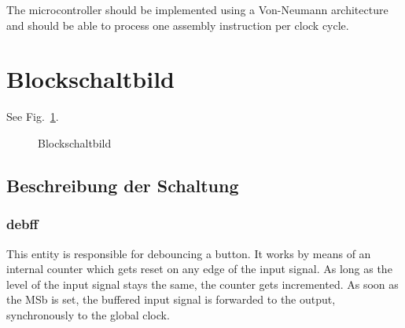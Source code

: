 \documentclass[a4paper,10pt]{scrartcl}
\begin{document}
The microcontroller should be implemented using a Von-Neumann architecture and should be able to process one assembly instruction per clock cycle. 


\section{Blockschaltbild}
\label{sec:block}

See Fig.\ \ref{fig:block}.


\begin{figure}[ht]
	\centering
\noindent{}
	\caption{Blockschaltbild}
	\label{fig:block}
\end{figure}



\subsection{Beschreibung der Schaltung}
\label{sec:schaltung}

\subsubsection{debff}
\label{sec:debff}

This entity is responsible for debouncing a button. It works by means
of an internal counter which gets reset on any edge of the input
signal. As long as the level of the input signal stays the same, the
counter gets incremented. As soon as the MSb is set, the buffered
input signal is forwarded to the output, synchronously to the global
clock.
\end{document}
